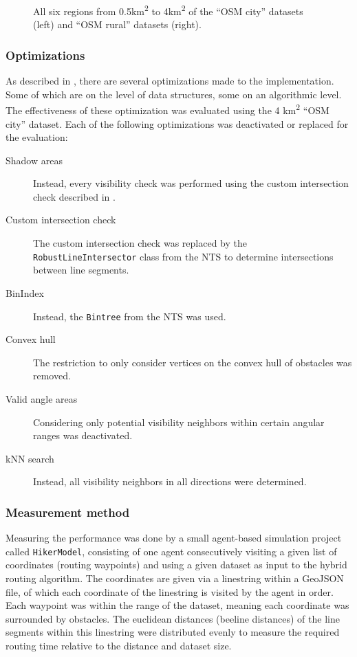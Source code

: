 \begin{figure}[h!]
\begin{minipage}[t]{.38\textwidth}
\begin{figcenter}
					\end{figcenter}
				\end{minipage}
				\caption{All six regions from 0.5km\textsuperscript{2} to 4km\textsuperscript{2} of the \enquote{OSM city} datasets (left) and \enquote{OSM rural} datasets (right).}
			\end{figure}
		
		\subsubsection{Optimizations}
		
			As described in , there are several optimizations made to the implementation.
			Some of which are on the level of data structures, some on an algorithmic level.
			The effectiveness of these optimization was evaluated using the 4 km\textsuperscript{2} \enquote{OSM city} dataset.
			Each of the following optimizations was deactivated or replaced for the evaluation:

			\begin{description}
				\item[Shadow areas] Instead, every visibility check was performed using the custom intersection check described in .
				\item[Custom intersection check] The custom intersection check was replaced by the \texttt{RobustLineIntersector} class from the NTS to determine intersections between line segments.
				\item[BinIndex] Instead, the \texttt{Bintree} from the NTS was used.
				\item[Convex hull] The restriction to only consider vertices on the convex hull of obstacles was removed.
				\item[Valid angle areas] Considering only potential visibility neighbors within certain angular ranges was deactivated.
				\item[kNN search] Instead, all visibility neighbors in all directions were determined.
			\end{description}		
			
		\subsubsection{Measurement method}
		
			Measuring the performance was done by a small agent-based simulation project called \texttt{HikerModel}, consisting of one agent consecutively visiting a given list of coordinates (routing waypoints) and using a given dataset as input to the hybrid routing algorithm.
			The coordinates are given via a linestring within a GeoJSON file, of which each coordinate of the linestring is visited by the agent in order.
			Each waypoint was within the range of the dataset, meaning each coordinate was surrounded by obstacles.
			The euclidean distances (beeline distances) of the line segments within this linestring were distributed evenly to measure the required routing time relative to the distance and dataset size.
			
